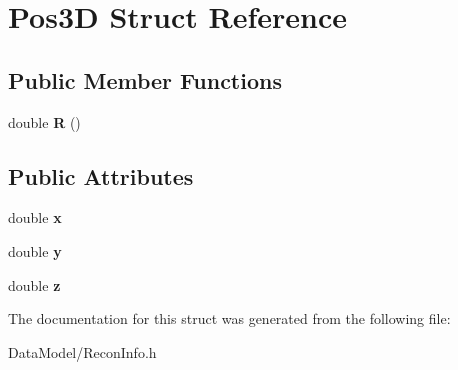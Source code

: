 \hypertarget{structPos3D}{\section{Pos3\-D Struct Reference}
\label{structPos3D}
}
\subsection*{Public Member Functions}
\begin{DoxyCompactItemize}
\item 
\hypertarget{structPos3D_a558c147eba6079b4e24a4e864f6bd888}{double {\bfseries R} ()}\label{structPos3D_a558c147eba6079b4e24a4e864f6bd888}

\end{DoxyCompactItemize}
\subsection*{Public Attributes}
\begin{DoxyCompactItemize}
\item 
\hypertarget{structPos3D_af72360d7df47870e345011dcddcf9c7c}{double {\bfseries x}}\label{structPos3D_af72360d7df47870e345011dcddcf9c7c}

\item 
\hypertarget{structPos3D_a6e538472b536e07f3f2825ef7f912e88}{double {\bfseries y}}\label{structPos3D_a6e538472b536e07f3f2825ef7f912e88}

\item 
\hypertarget{structPos3D_a6b26b787c2b9774956bb8236404e11a3}{double {\bfseries z}}\label{structPos3D_a6b26b787c2b9774956bb8236404e11a3}

\end{DoxyCompactItemize}


The documentation for this struct was generated from the following file\-:\begin{DoxyCompactItemize}
\item 
Data\-Model/Recon\-Info.\-h\end{DoxyCompactItemize}
